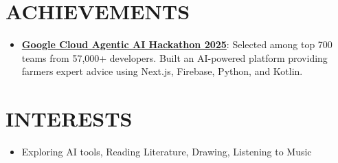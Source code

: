 \documentclass[letterpaper,11pt]{article}
\newcommand{\resumeItem}[1]{
  \item\small{
    {#1 \vspace{-2pt}}
  }
}
\newcommand{\resumeItemListStart}{\begin{itemize}}
\newcommand{\resumeItemListEnd}{\end{itemize}\vspace{-5pt}}
\begin{document}
\section{ACHIEVEMENTS}
    \vspace{0pt}
    \resumeItemListStart
        \resumeItem{\normalsize{\href{https://github.com/abhikumar002/Agentic-Gig-Project}{\textbf{Google Cloud Agentic AI Hackathon 2025}}: Selected among top 700 teams from 57,000+ developers. Built an AI-powered platform providing farmers expert advice using Next.js, Firebase, Python, and Kotlin.}}
    \resumeItemListEnd

\section{INTERESTS}
    \vspace{0pt}
    \resumeItemListStart
        \resumeItem{\normalsize{Exploring AI tools, Reading Literature, Drawing, Listening to Music}}
    \resumeItemListEnd
\end{document}
